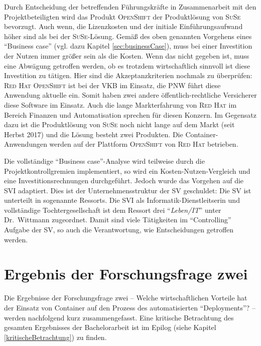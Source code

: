 Durch Entscheidung der betreffenden Führungskräfte in Zusammenarbeit mit den Projektbeteiligten wird das Produkt \textsc{OpenShift} der Produktlösung von \textsc{SuSe} bevorzugt. Auch wenn, die Lizenzkosten und der initiale Einführungsaufwand höher sind als bei der \textsc{SuSe}-Lösung. Gemäß des oben genannten Vorgehens eines \enquote{Business case} (vgl. dazu Kapitel \vref{sec:businessCase}), muss bei einer Investition der Nutzen immer größer sein als die Kosten. Wenn das nicht gegeben ist, muss eine Abwägung getroffen werden, ob es trotzdem wirtschaftlich sinnvoll ist diese Investition zu tätigen. Hier sind die Akzeptanzkriterien nochmals zu überprüfen: \textsc{Red Hat} \textsc{OpenShift} ist bei der \ac{VKB} im Einsatz, die \ac{PNW} führt diese Anwendung aktuelle ein. Somit haben zwei andere öffentlich-rechtliche Versicherer diese Software im Einsatz. Auch die lange Markterfahrung von \textsc{Red Hat} im Bereich Finanzen und Automatisation sprechen für diesen Konzern. Im Gegensatz dazu ist die Produktlösung von \textsc{SuSe} noch nicht lange auf dem Markt (seit Herbst 2017) und die Lösung besteht zwei Produkten. Die Container-Anwendungen werden auf der Plattform \textsc{OpenShift} von \textsc{Red Hat} betrieben.
\par
Die vollständige \enquote{Business case}-Analyse wird teilweise durch die Projektkontrollgremien implementiert, so wird ein Kosten-Nutzen-Vergleich und eine Investitionsrechnungen durchgeführt. Jedoch wurde das Vorgehen auf die \ac{SVI} adaptiert. Dies ist der Unternehmensstruktur der \ac{SV} geschuldet: Die \ac{SV} ist unterteilt in sogenannte Ressorts. Die \ac{SVI} als Informatik-Dienstleitserin und vollständige Tochtergesellschaft ist dem Ressort drei \enquote{\textit{Leben/IT}} unter Dr.~Wittmann zugeordnet. Damit sind viele Tätigkeiten im \enquote{Controlling} Aufgabe der \ac{SV}, so auch die Verantwortung, wie Entscheidungen getroffen werden. 

\section{Ergebnis der Forschungsfrage zwei}
Die Ergebnisse der Forschungsfrage zwei -- Welche wirtschaftlichen Vorteile hat der Einsatz von Container auf den Prozess des automatisierten \enquote{Deployments}? -- werden nachfolgend kurz zusammengefasst. Eine kritische Betrachtung des gesamten Ergebnisses der Bachelorarbeit ist im Epilog (siehe Kapitel \vref{kritischeBetrachtung}) zu finden.

